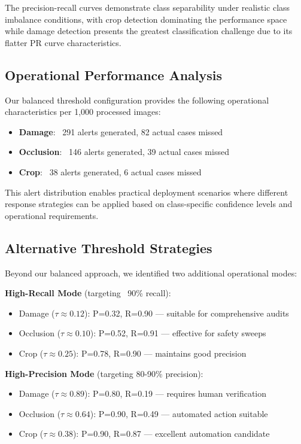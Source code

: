 \documentclass[12pt]{article}
\begin{document}
The precision-recall curves demonstrate class separability under realistic class imbalance conditions, with crop detection dominating the performance space while damage detection presents the greatest classification challenge due to its flatter PR curve characteristics.
\subsection{Operational Performance Analysis}

Our balanced threshold configuration provides the following operational characteristics per 1,000 processed images:

\begin{itemize}[itemsep=1pt,parsep=0pt,topsep=3pt]
\item \textbf{Damage}: ~291 alerts generated, 82 actual cases missed
\item \textbf{Occlusion}: ~146 alerts generated, 39 actual cases missed  
\item \textbf{Crop}: ~38 alerts generated, 6 actual cases missed
\end{itemize}

This alert distribution enables practical deployment scenarios where different response strategies can be applied based on class-specific confidence levels and operational requirements.

\subsection{Alternative Threshold Strategies}

Beyond our balanced approach, we identified two additional operational modes:

\textbf{High-Recall Mode} (targeting ~90\% recall):
\begin{itemize}[itemsep=1pt,parsep=0pt,topsep=2pt]
\item Damage ($\tau \approx 0.12$): P=0.32, R=0.90 — suitable for comprehensive audits
\item Occlusion ($\tau \approx 0.10$): P=0.52, R=0.91 — effective for safety sweeps
\item Crop ($\tau \approx 0.25$): P=0.78, R=0.90 — maintains good precision
\end{itemize}

\textbf{High-Precision Mode} (targeting 80-90\% precision):
\begin{itemize}[itemsep=1pt,parsep=0pt,topsep=2pt]
\item Damage ($\tau \approx 0.89$): P=0.80, R=0.19 — requires human verification
\item Occlusion ($\tau \approx 0.64$): P=0.90, R=0.49 — automated action suitable
\item Crop ($\tau \approx 0.38$): P=0.90, R=0.87 — excellent automation candidate
\end{itemize}
\end{document}
